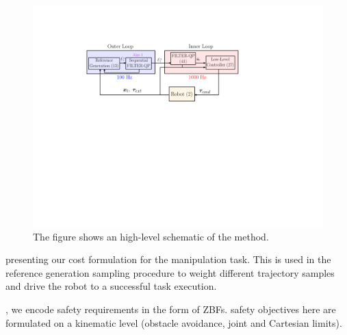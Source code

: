
\begin{figure}[t!]
\centering
\vspace{-0.5cm}
\includegraphics[width=0.95\columnwidth] {figures/receding_horizon_new_paper2.pdf}
\caption{The figure shows an high-level schematic of the method. } \label{fig:block_scheme}
\end{figure}


 presenting our cost formulation for the manipulation task. This is used in the reference generation sampling procedure to weight different trajectory samples and drive the robot to a successful task execution.

, we encode safety requirements in the form of ZBFs.  safety objectives  here are formulated on a kinematic level (obstacle avoidance, joint and Cartesian limits).

